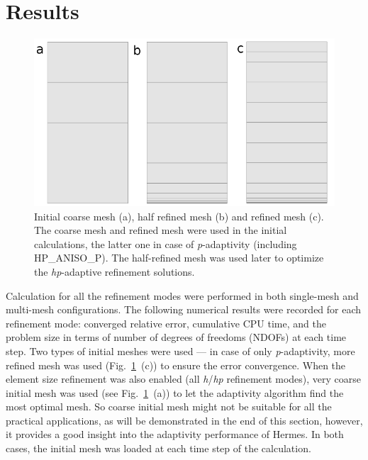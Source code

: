 \section{Results}\label{sec:results}

\begin{figure}
  \begin{centering}
  \includegraphics[width=.8\columnwidth]{mesh}
  \caption{\label{fig:mesh} Initial coarse mesh (a),
  	half refined mesh (b) and refined mesh (c). The coarse mesh
	and refined mesh were used in the initial calculations, the latter one
	in case of \emph{p}-adaptivity (including HP\_ANISO\_P). The half-refined mesh was
	used later to optimize the \emph{hp}-adaptive refinement solutions.}
  \end{centering}
\end{figure}
Calculation for all the refinement modes were performed
in both single-mesh and multi-mesh configurations. 
The following numerical results were recorded for each 
refinement mode: converged relative error, cumulative CPU
time, and the problem size in terms of number
of degrees of freedoms (NDOFs) at each time step. 
Two types of initial meshes were used --- in case of only \emph{p}-adaptivity,
more refined mesh was used (Fig.~\ref{fig:mesh}~(c)) to ensure
the error convergence.
When the element size refinement
was also enabled (all \emph{h}/\emph{hp} refinement modes), very coarse initial mesh
was used (see Fig.~\ref{fig:mesh}~(a)) to let the adaptivity
algorithm find the most optimal mesh. So coarse initial mesh might not be
suitable for all the practical applications, as will be demonstrated in the
end of this section, however, it provides a good insight into the
adaptivity performance of Hermes.
In both cases, the initial mesh was loaded at each time step of the
calculation.

